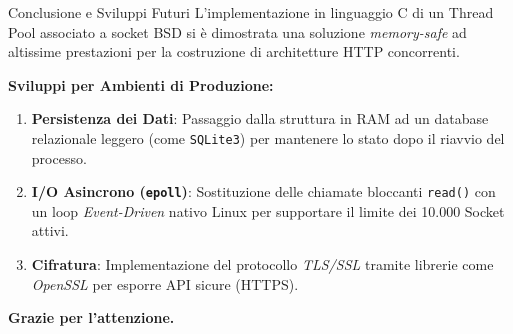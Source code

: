 \documentclass[aspectratio=169, 10pt]{beamer}
\begin{document}
\begin{frame}{Conclusione e Sviluppi Futuri}
    L'implementazione in linguaggio C di un Thread Pool associato a socket BSD si è dimostrata una soluzione \textit{memory-safe} ad altissime prestazioni per la costruzione di architetture HTTP concorrenti.

    \vspace{0.4cm}
    \textbf{Sviluppi per Ambienti di Produzione:}
    \begin{enumerate}
        \item \textbf{Persistenza dei Dati}: Passaggio dalla struttura in RAM ad un database relazionale leggero (come \texttt{SQLite3}) per mantenere lo stato dopo il riavvio del processo.
        \item \textbf{I/O Asincrono (\texttt{epoll})}: Sostituzione delle chiamate bloccanti \texttt{read()} con un loop \textit{Event-Driven} nativo Linux per supportare il limite dei 10.000 Socket attivi.
        \item \textbf{Cifratura}: Implementazione del protocollo \textit{TLS/SSL} tramite librerie come \textit{OpenSSL} per esporre API sicure (HTTPS).
    \end{enumerate}
    
    \vspace{0.5cm}
    \centering
    \Large \textbf{Grazie per l'attenzione.}
\end{frame}
\end{document}
